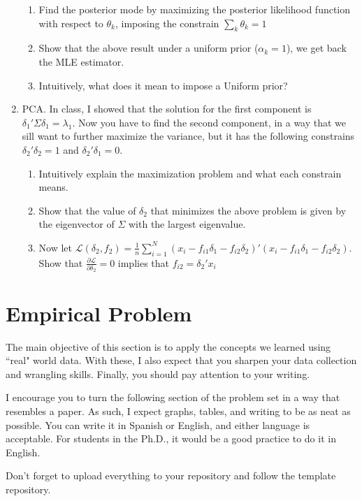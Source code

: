 \documentclass[12pt,onecolumn]{article}
\begin{document}
\begin{enumerate}
\begin{enumerate}
  \item Find the posterior mode by maximizing the posterior likelihood function with respect to $\theta_k$, imposing the constrain  $\sum_k\theta_k=1$
  \item Show that the above result under a uniform prior ($\alpha_k=1$), we get back the MLE estimator. 
  \item Intuitively, what does it mean to impose a Uniform prior?
\end{enumerate}
\item PCA. In class, I showed that the solution for the first component is $\delta_1'\Sigma\delta_1=\lambda_1$. Now you have to find the second component, in a way that we sill want to further maximize the variance, but it has the following constrains $\delta_2'\delta_2=1$ and $\delta_2'\delta_1=0$.
\begin{enumerate}
  \item Intuitively explain the maximization problem and what each constrain means.
  \item Show that the value of $\delta_2$ that minimizes the above problem is given by the eigenvector of $\Sigma$ with the largest eigenvalue.
  \item Now let $\mathcal{L}(\delta_2,f_2)=\frac{1}{n}\sum_{i=1}^N(x_i-f_{i1}\delta_1-f_{i2}\delta_2)'(x_i-f_{i1}\delta_1-f_{i2}\delta_2)$. Show that $\frac{\partial \mathcal{L}}{ \partial \delta_2} =0$ implies that $f_{i2}=\delta_2'x_i$

\end{enumerate}
\end{enumerate}


\section{Empirical Problem}



The main objective of this section is to apply the concepts we learned using ``real" world data. With these, I also expect that you sharpen your data collection and wrangling skills. Finally, you should pay attention to your writing.

I encourage you to turn the following section of the problem set in a way that resembles a paper. As such, I expect graphs, tables, and writing to be as neat as possible. You can write it in Spanish or English, and either language is acceptable. For students in the Ph.D., it would be a good practice to do it in English.

Don't forget to upload everything to your repository and follow the template repository. 
\end{document}

